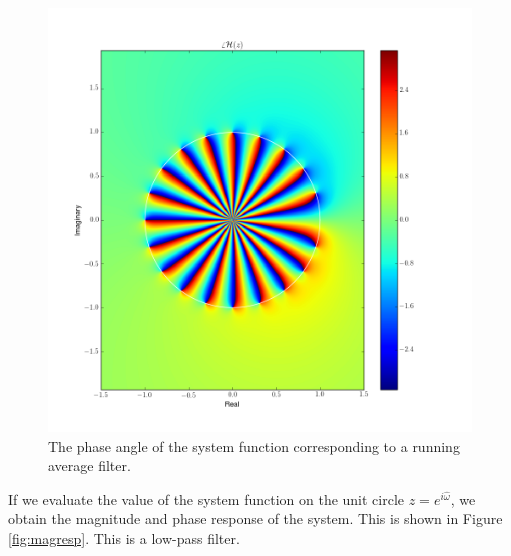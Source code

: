 \begin{figure}
\begin{center}
\includegraphics[width=\textwidth]{ch18/figures/zcol2p.png}
\end{center}
\caption{The phase angle of the system function corresponding to a running average filter.}
\label{fig:rma_l20_phase}
\end{figure}

If we evaluate the value of the system function on the unit circle
$z=e^{i\hat{\omega}}$, we obtain the magnitude and phase response of
the system. This is shown in Figure \ref{fig:magresp}. This is a
low-pass filter.

\fi
